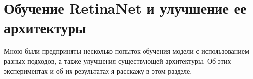 \section{Обучение RetinaNet и улучшение ее архитектуры}

Мною были предприняты несколько попыток обучения модели с использованием разных подходов, а также улучшения существующей архитектуры. Об этих экспериментах и об их результатах я расскажу в этом разделе.






\clearpage
